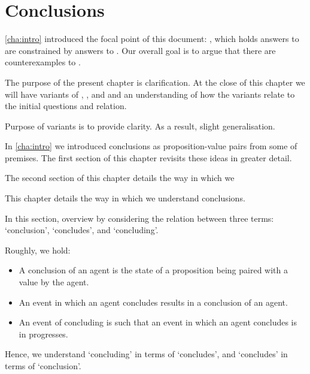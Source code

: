 \chapter{Conclusions}
\label{cha:clar}

\begin{note}
  \autoref{cha:intro} introduced the focal point of this document:
  \issueInclusion{}, which holds answers to \qWhy{} are constrained by answers to \qHow{}.
  Our overall goal is to argue that there are counterexamples to \issueInclusion{}.

  The purpose of the present chapter is clarification.
  At the close of this chapter we will have variants of \qWhy{}, \qHow{}, and \issueInclusion{} and an understanding of how the variants relate to the initial questions and relation.

  Purpose of variants is to provide clarity.
  As a result, slight generalisation.
\end{note}

\begin{note}
  In \autoref{cha:intro} we introduced conclusions as proposition-value pairs from some \pool{} of premises.
  The first section of this chapter revisits these ideas in greater detail.

  The second section of this chapter details the way in which we 



  This chapter details the way in which we understand conclusions.
  
\end{note}

\begin{note}
  In this section, overview by considering the relation between three terms:
  `conclusion', `concludes', and `concluding'.

  Roughly, we hold:

  \begin{itemize}
  \item
    A conclusion of an agent is the state of a proposition being paired with a value by the agent.
  \item
    An event in which an agent concludes results in a conclusion of an agent.
  \item
    An event of concluding is such that an event in which an agent concludes is in progresses.
  \end{itemize}

  Hence, we understand `concluding' in terms of `concludes', and `concludes' in terms of `conclusion'.
\end{note}


